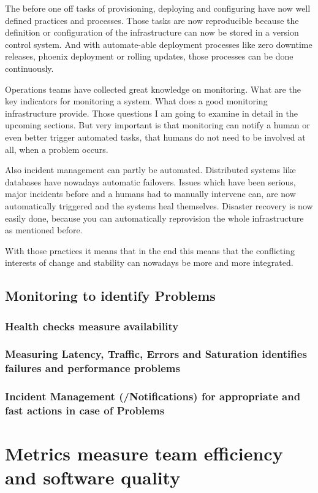 The before one off tasks of provisioning, deploying and configuring have now well defined practices and processes. Those tasks are now reproducible because the definition or configuration of the infrastructure can now be stored in a version control system. And with automate-able deployment processes like zero downtime releases, phoenix deployment or rolling updates, those processes can be done continuously.

Operations teams have collected great knowledge on monitoring. What are the key indicators for monitoring a system. What does a good monitoring infrastructure provide. Those questions I am going to examine in detail in the upcoming sections. But very important is that monitoring can notify a human or even better trigger automated tasks, that humans do not need to be involved at all, when a problem occurs.

Also incident management can partly be automated. Distributed systems like databases have nowadays automatic failovers. Issues which have been serious, major incidents before and a humans had to manually intervene can, are now automatically triggered and the systems heal themselves. Disaster recovery is now easily done, because you can automatically reprovision the whole infrastructure as mentioned before.

With those practices it means that in the end this means that the conflicting interests of change and stability can nowadays be more and more integrated.

\section{Monitoring to identify Problems}
\subsection{Health checks measure availability}
\subsection{Measuring Latency, Traffic, Errors and Saturation identifies failures and performance problems}
\subsection{Incident Management (/Notifications) for appropriate and fast actions in case of Problems}

\chapter{Metrics measure team efficiency and software quality}
